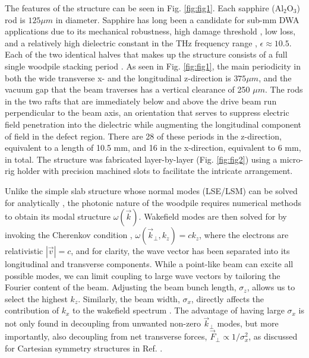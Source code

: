 \documentclass{article}
\begin{document}
The features of the structure can be seen in Fig. \ref{fig:fig1}. Each sapphire (Al$_2$O$_3$) rod is $125\mu m$ in diameter. Sapphire has long been a candidate for sub-mm DWA applications due to its mechanical robustness, high damage threshold \cite{England2014}, low loss, and a relatively high dielectric constant in the THz frequency range \cite{Grischkowsky1990a},  $\epsilon \approx 10.5$. Each of the two identical halves that makes up the structure consists of a full single woodpile stacking period \cite{Ho1994,Joannopoulos2008}. As seen in Fig. \ref{fig:fig1}, the main periodicity in both the wide transverse x- and the longitudinal z-direction is $375 \mu m$, and the vacuum gap that the beam traverses has a vertical clearance of 250 $\mu m$. The rods in the two rafts that are immediately below and above the drive beam run perpendicular to the beam axis, an orientation that serves to suppress electric field penetration into the dielectric while augmenting the longitudinal component of field in the defect region. There are 28 of these periods in the z-direction, equivalent to a length of 10.5 mm, and 16 in the x-direction, equivalent to 6 mm, in total. The structure was fabricated layer-by-layer (Fig. \ref{fig:fig2}) using a micro-rig holder with precision machined slots to facilitate the intricate arrangement. 

Unlike the simple slab structure whose normal modes (LSE/LSM) can be solved for analytically \cite{collin1990,mihalcea2012,xiao2001,jing2003}, the photonic nature of the woodpile requires numerical methods to obtain its modal structure $\omega(\vec{k})$. Wakefield modes are then solved for by invoking the Cherenkov condition \cite{Kremers2009}, $\omega(\vec{k}_\perp, k_z) = c k_{z}$, where the electrons are relativistic $|\vec{v}|=c$, and for clarity, the wave vector has been separated into its longitudinal and transverse components. While a point-like beam can excite all possible modes, we can limit coupling to large wave vectors by tailoring the Fourier content of the beam. Adjusting the beam bunch length, $\sigma_z$, allows us to select the highest $k_z$. Similarly, the beam width, $\sigma_x$, directly affects the contribution of $k_x$ to the wakefield spectrum \cite{Baturin2013}. The advantage of having large $\sigma_x$ is not only found in decoupling from unwanted non-zero $\vec{k}_\perp$ modes, but more importantly, also decoupling from net transverse forces, $\vec{F}_\perp \propto 1/\sigma^2_x$, as discussed for Cartesian symmetry structures in Ref. \cite{Tremaine1997}.
\end{document}
